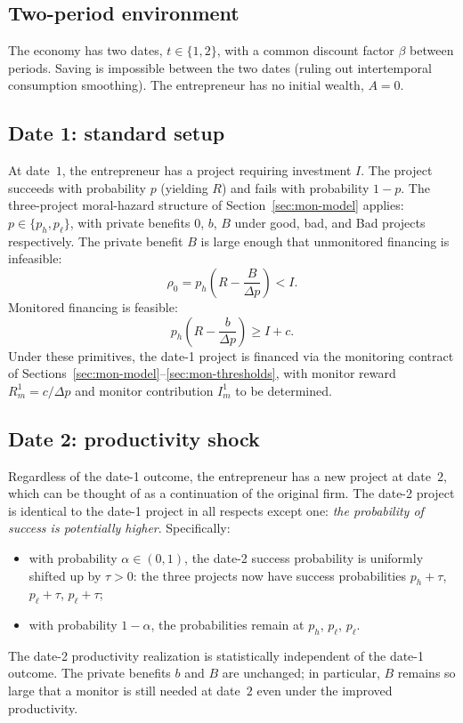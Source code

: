 \documentclass[11pt,a4paper,oneside]{book}
\def\geq{\geqslant}
\theoremstyle{plain}
\theoremstyle{definition}
\theoremstyle{remark}
\numberwithin{equation}{chapter}
\begin{document}
\subsection{Two-period environment}

The economy has two dates, $t \in \{1, 2\}$, with a common discount factor $\beta$ between periods.
Saving is impossible between the two dates (ruling out intertemporal consumption smoothing).
The entrepreneur has no initial wealth, $A = 0$.

\subsection{Date 1: standard setup}

At date~$1$, the entrepreneur has a project requiring investment $I$.
The project succeeds with probability $p$ (yielding $R$) and fails with probability $1 - p$.
The three-project moral-hazard structure of Section~\ref{sec:mon-model} applies: $p \in \{p_h, p_\ell\}$, with private benefits $0$, $b$, $B$ under good, bad, and Bad projects respectively.
The private benefit $B$ is large enough that unmonitored financing is infeasible:
\begin{equation}\label{eq:mon-date1-infeasible}
  \rho_0 = p_h \left( R - \frac{B}{\Delta p} \right) < I.
\end{equation}
Monitored financing is feasible:
\begin{equation}\label{eq:mon-date1-feasible}
  p_h \left( R - \frac{b}{\Delta p} \right) \geq I + c.
\end{equation}
Under these primitives, the date-1 project is financed via the monitoring contract of Sections~\ref{sec:mon-model}--\ref{sec:mon-thresholds}, with monitor reward $R_m^1 = c/\Delta p$ and monitor contribution $I_m^1$ to be determined.

\subsection{Date 2: productivity shock}

Regardless of the date-1 outcome, the entrepreneur has a new project at date~$2$, which can be thought of as a continuation of the original firm.
The date-2 project is identical to the date-1 project in all respects except one: \emph{the probability of success is potentially higher}.
Specifically:
\begin{itemize}
  \item with probability $\alpha \in (0, 1)$, the date-2 success probability is uniformly shifted up by $\tau > 0$: the three projects now have success probabilities $p_h + \tau$, $p_\ell + \tau$, $p_\ell + \tau$;
  \item with probability $1 - \alpha$, the probabilities remain at $p_h$, $p_\ell$, $p_\ell$.
\end{itemize}
The date-2 productivity realization is statistically independent of the date-1 outcome.
The private benefits $b$ and $B$ are unchanged; in particular, $B$ remains so large that a monitor is still needed at date~$2$ even under the improved productivity.
\end{document}

